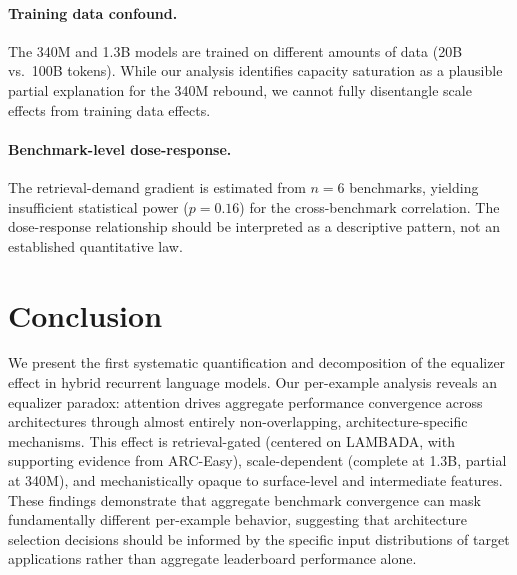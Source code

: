 \documentclass[11pt,a4paper]{article}
\begin{document}
\paragraph{Training data confound.}
The 340M and 1.3B models are trained on different amounts of data (20B vs.\ 100B tokens). While our analysis identifies capacity saturation as a plausible partial explanation for the 340M rebound, we cannot fully disentangle scale effects from training data effects.

\paragraph{Benchmark-level dose-response.}
The retrieval-demand gradient is estimated from $n{=}6$ benchmarks, yielding insufficient statistical power ($p{=}0.16$) for the cross-benchmark correlation. The dose-response relationship should be interpreted as a descriptive pattern, not an established quantitative law.

\section{Conclusion}

We present the first systematic quantification and decomposition of the equalizer effect in hybrid recurrent language models. Our per-example analysis reveals an equalizer paradox: attention drives aggregate performance convergence across architectures through almost entirely non-overlapping, architecture-specific mechanisms. This effect is retrieval-gated (centered on LAMBADA, with supporting evidence from ARC-Easy), scale-dependent (complete at 1.3B, partial at 340M), and mechanistically opaque to surface-level and intermediate features. These findings demonstrate that aggregate benchmark convergence can mask fundamentally different per-example behavior, suggesting that architecture selection decisions should be informed by the specific input distributions of target applications rather than aggregate leaderboard performance alone.
\end{document}

